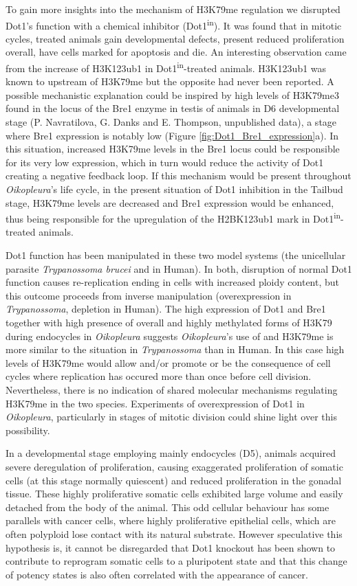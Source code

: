 \documentclass[11pt,twoside,a4paper]{report}
\begin{document}
To gain more insights into the mechanism of H3K79me regulation we disrupted Dot1's function with a chemical inhibitor (Dot1\textsuperscript{in}). It was found that in mitotic cycles, treated animals gain developmental defects, present reduced proliferation overall, have cells marked for apoptosis and die. An interesting observation came from the increase of H3K123ub1 in Dot1\textsuperscript{in}-treated animals. H3K123ub1 was known to upstream of H3K79me but the opposite had never been reported. A possible mechanistic explanation could be inspired by high levels of H3K79me3 found in the locus of the Bre1 enzyme in testis of animals in D6 developmental stage (P. Navratilova, G. Danks and E. Thompson, unpublished data), a stage where Bre1 expression is notably low (Figure \ref{fig:Dot1_Bre1_expression}a). In this situation, increased H3K79me levels in the Bre1 locus could be responsible for its very low expression, which in turn would reduce the activity of Dot1 creating a negative feedback loop. If this mechanism would be present throughout \textit{Oikopleura}'s life cycle, in the present situation of Dot1 inhibition in the Tailbud stage, H3K79me levels are decreased and Bre1 expression would be enhanced, thus being responsible for the upregulation of the H2BK123ub1 mark in Dot1\textsuperscript{in}-treated animals.

Dot1 function has been manipulated in these two model systems (the unicellular parasite \textit{Trypanossoma brucei} and in Human). In both, disruption of normal Dot1 function causes re-replication ending in cells with increased ploidy content, but this outcome proceeds from inverse manipulation (overexpression in \textit{Trypanossoma}, depletion in Human). The high expression of Dot1 and Bre1 together with high presence of overall and highly methylated forms of H3K79 during endocycles in \textit{Oikopleura} suggests \textit{Oikopleura}'s use of and H3K79me is more similar to the situation in \textit{Trypanossoma} than in Human. In this case high levels of H3K79me would allow and/or promote or be the consequence of cell cycles where replication has occured more than once before cell division. Nevertheless, there is no indication of shared molecular mechanisms regulating H3K79me in the two species. Experiments of overexpression of Dot1 in \textit{Oikopleura}, particularly in stages of mitotic division could shine light over this possibility.

In a developmental stage employing mainly endocycles (D5), animals acquired severe deregulation of proliferation, causing exaggerated proliferation of somatic cells (at this stage normally quiescent) and reduced proliferation in the gonadal tissue. These highly proliferative somatic cells exhibited large volume and easily detached from the body of the animal. This odd cellular behaviour has some parallels with cancer cells, where highly proliferative epithelial cells, which are often polyploid lose contact with its natural substrate. However speculative this hypothesis is, it cannot be disregarded that Dot1 knockout has been shown to contribute to reprogram somatic cells to a pluripotent state \cite{Onder2012} and that this change of potency states is also often correlated with the appearance of cancer.
\end{document}
